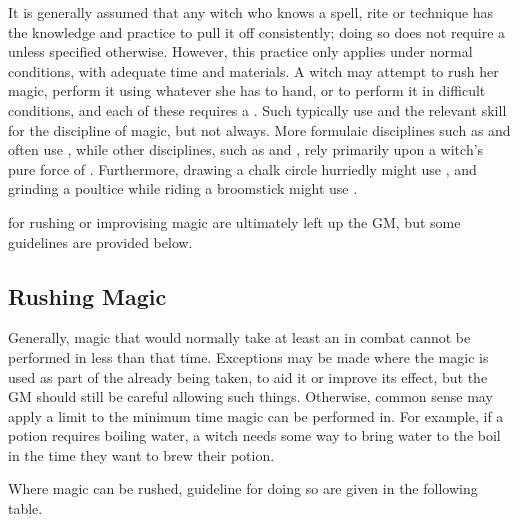 It is generally assumed that any witch who knows a spell, rite or technique has the knowledge and practice to pull it off consistently; doing so does not require a {\test} unless specified otherwise.
However, this practice only applies under normal conditions, with adequate time and materials.
A witch may attempt to rush her magic, perform it using whatever she has to hand, or to perform it in difficult conditions, and each of these requires a {\test}.
Such {\tests} typically use  and the relevant skill for the discipline of magic, but not always.
More formulaic disciplines such as  and  often use , while other disciplines, such as  and , rely primarily upon a witch's pure force of .
Furthermore, drawing a chalk circle hurriedly might use , and grinding a poultice while riding a broomstick might use .

\capital{\tns} for rushing or improvising magic are ultimately left up the GM, but some guidelines are provided below.

\subsection{Rushing Magic}

Generally, magic that would normally take at least an {\action} in combat cannot be performed in less than that time.
Exceptions may be made where the magic is used as part of the {\action} already being taken, to aid it or improve its effect, but the GM should still be careful allowing such things.
Otherwise, common sense may apply a limit to the minimum time magic can be performed in.
For example, if a potion requires boiling water, a witch needs some way to bring water to the boil in the time they want to brew their potion.

Where magic can be rushed, guideline {\tns} for doing so are given in the following table.


